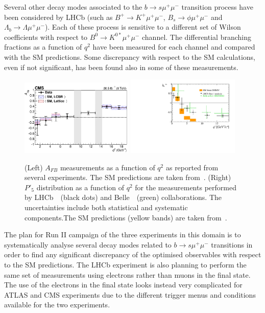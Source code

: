 Several other decay modes associated to the $b \to s \mu^+ \mu^-$ transition process have been considered by LHCb (such as $B^+ \to K^{+} \mu^+ \mu^-$, $B_s \to  \phi \mu^+ \mu^-$ and $\Lambda_b \to \Lambda \mu^+ \mu^-$). Each of these process is sensitive to a different set of Wilson coefficients with respect to $B^0 \to  K^{0*} \mu^+ \mu^-$ channel. The differential branching fractions as a function of $q^2$ have been measured for each channel and compared with the SM predictions. Some discrepancy with respect to the SM calculations, even if not significant, has been found also in some of these measurements.
\begin{figure}[!t]
  \begin{center}
  \includegraphics[width=0.48\textwidth]{AFB_CMS.png}
  \includegraphics[width=0.48\textwidth]{P5p.pdf}
    \caption {(Left) $A_{FB}$ measurements as a function of $q^2$ as reported from several experiments. The SM predictions are taken from~\cite{ABSZ,ABSZ2}. (Right) $P'_5$ distribution as a function of $q^2$ for the measurements performed by LHCb~\cite{mumuK_LHCb}~(black dots) and Belle~\cite{Belle}~(green) collaborations. The uncertainties include both statistical and systematic components.The SM predictions (yellow bands) are taken from~\cite{DHMV}. }
        \label{fig:mumuK}
  \end{center}
\end{figure}

The plan for Run II campaign of the three experiments in this domain is to systematically analyse several decay modes related to $b \to s \mu^+ \mu^-$  transitions in order to find any significant discrepancy of the optimised observables with respect to the SM predictions. The LHCb experiment is also planning to perform the same set of measurements using electrons rather than muons in the final state. The use of the electrons in the final state looks instead very complicated for ATLAS and CMS experiments due to the different trigger menus and conditions available for the two experiments.

